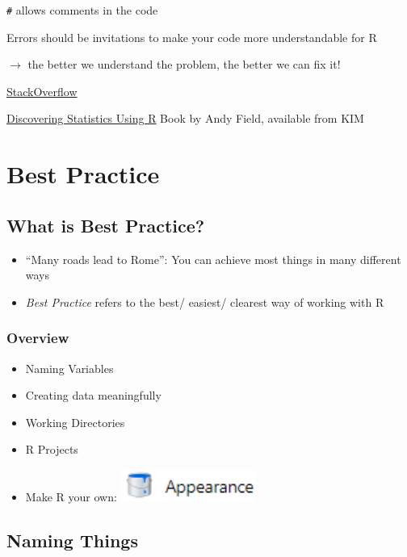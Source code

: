 \documentclass[
]{book}
\providecommand{\tightlist}{%
  \setlength{\itemsep}{0pt}\setlength{\parskip}{0pt}}
\begin{document}
\texttt{\#} allows comments in the code

Errors should be invitations to make your code more understandable for R

\(\rightarrow\) the better we understand the problem, the better we can fix it!

\href{https://stackoverflow.com/}{StackOverflow}

\href{https://katalog.uni-konstanz.de/libero/WebOpac.cls?VERSION=2&ACTION=DISPLAY&RSN=2222774&DATA=KON&TOKEN=nGIfSiZsIA5826&Z=1&SET=1}{Discovering Statistics Using R} Book by Andy Field, available from KIM

\chapter{Best Practice}\label{best-practice}

\section{What is Best Practice?}\label{what-is-best-practice}

\begin{itemize}
\tightlist
\item
  ``Many roads lead to Rome'': You can achieve most things in many different ways
\item
  \emph{Best Practice} refers to the best/ easiest/ clearest way of working with R
\end{itemize}

\subsection{Overview}\label{overview}

\begin{itemize}
\tightlist
\item
  Naming Variables
\item
  Creating data meaningfully
\item
  Working Directories
\item
  R Projects
\item
  Make R your own: \includegraphics[width=\textwidth,height=0.41667in]{./img/appearance.png}
\end{itemize}

\section{Naming Things}\label{naming-things}
\end{document}
